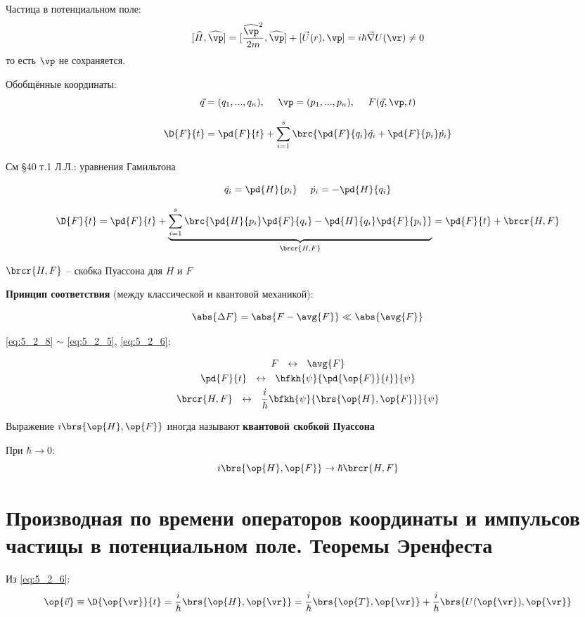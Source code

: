 Частица в потенциальном поле:
\begin{equation}
\label{eq:5_2_7}
[\widehat{H}, \widehat{\vp}] = [\frac{\widehat{\vp}^2}{2m}, \widehat{\vp}] + [\vec{U}(r), \vp] = i \hbar \vec{\nabla} U(\vr) \ne 0
\end{equation}
то есть $\vp$ не сохраняется.

Обобщённые координаты:
$$
\vec{q} = (q_1, ..., q_n),~~~~ \vp = (p_1, ..., p_n), ~~~~ F(\vec{q}, \vp, t)
$$

$$
\D{F}{t} = \pd{F}{t} + \sum_{i=1}^{s}\brc{\pd{F}{q_i} \dot{q_i} + \pd{F}{p_i} \dot{p_i} }
$$

См \S 40 т.1 Л.Л.: уравнения Гамильтона

$$
\dot{q_i} = \pd{H}{p_i} ~~~~ \dot{p_i} = -\pd{H}{q_i}
$$

\begin{equation}
\label{eq:5_2_8}
\D{F}{t}= \pd{F}{t} + \underbrace{ \sum_{i=1}^{s} \brc{ \pd{H}{p_i} \pd{F}{q_i} - \pd{H}{q_i} \pd{F}{p_i} } }_{\brcr{H, F}} = \pd{F}{t} + \brcr{H, F}
\end{equation}

$\brcr{H, F}$ -- скобка Пуассона для $H$ и $F$

\textbf{Принцип соответствия} (между классической и квантовой механикой):

$$
\abs{\Delta F} = \abs{F - \avg{F}} \ll \abs{\avg{F}}
$$

\eqref{eq:5_2_8} $\sim$ \eqref{eq:5_2_5}, \eqref{eq:5_2_6}:

$$
\begin{gathered}
F ~~\leftrightarrow~~ \avg{F} \\
\pd{F}{t} ~~\leftrightarrow~~ \bfkh{\psi}{\pd{\op{F}}{t}}{\psi} \\
\brcr{H, F} ~~\leftrightarrow~~ \frac{i}{\hbar} \bfkh{\psi}{ \brs{\op{H}, \op{F}} }{\psi}
\end{gathered}
$$

Выражение $i \brs{\op{H}, \op{F}}$ иногда называют \textbf{квантовой скобкой Пуассона}

При $\hbar \to 0$:
$$
i \brs{\op{H}, \op{F}} \to \hbar \brcr{H, F}
$$


\section{Производная по времени операторов координаты и импульсов частицы в потенциальном поле. Теоремы Эренфеста}

Из \eqref{eq:5_2_6}:
$$
\op{\vec{v}} \equiv \D{\op{\vr}}{t} = \frac{i}{\hbar} \brs{\op{H}, \op{\vr}} = \frac{i}{\hbar} \brs{\op{T}, \op{\vr}} + \frac{i}{\hbar} \brs{U(\op{\vr}), \op{\vr}}
$$

